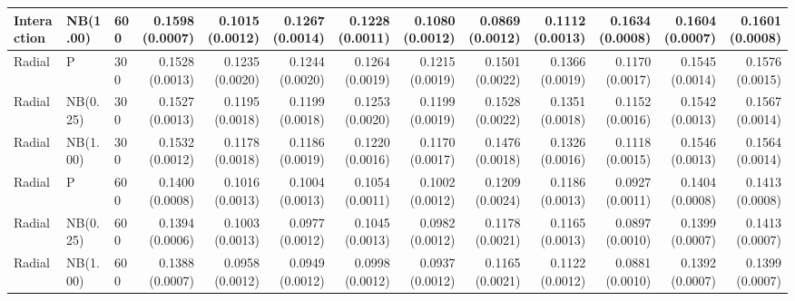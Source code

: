 \begin{table}[p]
{\begin{tabular}{lllrrrrrrrrrr}
Interaction & NB(1.00) & 600 & 0.1598 (0.0007) & 0.1015 (0.0012) & 0.1267 (0.0014) & 0.1228 (0.0011) & 0.1080 (0.0012) & 0.0869 (0.0012) & 0.1112 (0.0013) & 0.1634 (0.0008) & 0.1604 (0.0007) & 0.1601 (0.0008) \\
\hline
Radial & P & 300 & 0.1528 (0.0013) & 0.1235 (0.0020) & 0.1244 (0.0020) & 0.1264 (0.0019) & 0.1215 (0.0019) & 0.1501 (0.0022) & 0.1366 (0.0019) & 0.1170 (0.0017) & 0.1545 (0.0014) & 0.1576 (0.0015) \\
Radial & NB(0.25) & 300 & 0.1527 (0.0013) & 0.1195 (0.0018) & 0.1199 (0.0018) & 0.1253 (0.0020) & 0.1199 (0.0019) & 0.1528 (0.0022) & 0.1351 (0.0018) & 0.1152 (0.0016) & 0.1542 (0.0013) & 0.1567 (0.0014) \\
Radial & NB(1.00) & 300 & 0.1532 (0.0012) & 0.1178 (0.0018) & 0.1186 (0.0019) & 0.1220 (0.0016) & 0.1170 (0.0017) & 0.1476 (0.0018) & 0.1326 (0.0016) & 0.1118 (0.0015) & 0.1546 (0.0013) & 0.1564 (0.0014) \\
Radial & P & 600 & 0.1400 (0.0008) & 0.1016 (0.0013) & 0.1004 (0.0013) & 0.1054 (0.0011) & 0.1002 (0.0012) & 0.1209 (0.0024) & 0.1186 (0.0013) & 0.0927 (0.0011) & 0.1404 (0.0008) & 0.1413 (0.0008) \\
Radial & NB(0.25) & 600 & 0.1394 (0.0006) & 0.1003 (0.0013) & 0.0977 (0.0012) & 0.1045 (0.0013) & 0.0982 (0.0012) & 0.1178 (0.0021) & 0.1165 (0.0013) & 0.0897 (0.0010) & 0.1399 (0.0007) & 0.1413 (0.0007) \\
Radial & NB(1.00) & 600 & 0.1388 (0.0007) & 0.0958 (0.0012) & 0.0949 (0.0012) & 0.0998 (0.0012) & 0.0937 (0.0012) & 0.1165 (0.0021) & 0.1122 (0.0012) & 0.0881 (0.0010) & 0.1392 (0.0007) & 0.1399 (0.0007) \\
\hline
\end{tabular}%
}
\end{table}


